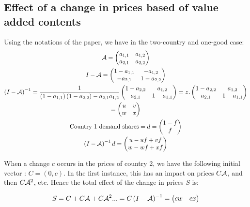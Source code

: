 \documentclass[12pt,a4paper]{article}
\begin{document}
\subsection*{Effect of a change in prices based of value added contents}
Using the notations of the paper, we have in the two-country and one-good case:
\begin{gather*}
\cal {A} = \left(\begin{matrix}a_{1,1}&a_{1,2}\\a_{2,1}&a_{2,2}\end{matrix}\right)
\\
I-\cal {A}=\left(\begin{matrix}1-a_{1,1}&-a_{1,2}\\-a_{2,1}&1-a_{2,2}\end{matrix}\right)
\\
\left(I-\cal {A}\right)^{-1}=\frac{1}{\left(1-a_{1,1}\right)\left(1-a_{2,2}\right)-a_{2,1}a_{1,2}}\left(\begin{matrix}1-a_{2,2}&a_{1,2}\\a_{2,1}&1-a_{1,1}\end{matrix}\right) =z.\left(\begin{matrix}1-a_{2,2}&a_{1,2}\\a_{2,1}&1-a_{1,1}\end{matrix}\right) \\ 
=\left(\begin{matrix}u&v\\w&x\end{matrix}\right)
\\
\text{Country 1 demand shares}=d=\left(\begin{matrix}1-f\\f\end{matrix}\right) \\
\left(I-\cal {A}\right)^{-1}d=\left(\begin{matrix}u-uf+vf\\w-wf+xf\end{matrix}\right)
\end{gather*}

When a change $c$ occurs in the prices of country 2, we have the following initial vector : $C=\left(0,c\right)$.
In the first instance, this has an impact on prices $C\cal {A}$, and then $C{\cal{A}}^{2}$, etc.
Hence the total effect of the change in prices $S$ is: 


\begin{equation*}
S=C+C{\cal{A}}+C{\cal{A}}^{2}...=C\left(I-{\cal{A}}\right)^{-1}=\left(\begin{matrix}cw  &   cx\end{matrix}\right)
\end{equation*}
\end{document}
